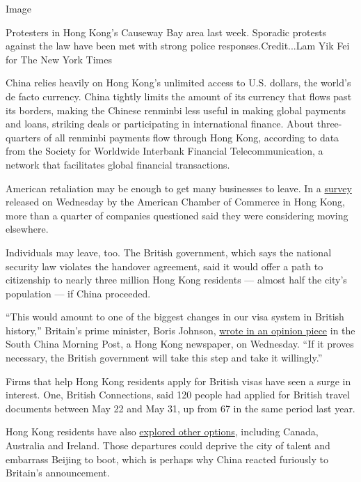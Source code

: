 Image

Protesters in Hong Kong's Causeway Bay area last week. Sporadic protests
against the law have been met with strong police responses.Credit...Lam
Yik Fei for The New York Times

China relies heavily on Hong Kong's unlimited access to U.S. dollars,
the world's de facto currency. China tightly limits the amount of its
currency that flows past its borders, making the Chinese renminbi less
useful in making global payments and loans, striking deals or
participating in international finance. About three-quarters of all
renminbi payments flow through Hong Kong, according to data from the
Society for Worldwide Interbank Financial Telecommunication, a network
that facilitates global financial transactions.

American retaliation may be enough to get many businesses to leave. In a
\href{https://amcham.org.hk/uploads/media/default/0001/08/e63cc524fe6b2d94c1b12b01c6249e144a394a9a.pdf}{survey}
released on Wednesday by the American Chamber of Commerce in Hong Kong,
more than a quarter of companies questioned said they were considering
moving elsewhere.

Individuals may leave, too. The British government, which says the
national security law violates the handover agreement, said it would
offer a path to citizenship to nearly three million Hong Kong residents
--- almost half the city's population --- if China proceeded.

``This would amount to one of the biggest changes in our visa system in
British history,'' Britain's prime minister, Boris Johnson,
\href{https://www.scmp.com/comment/opinion/article/3087252/hongkongers-fearing-their-way-life-britain-will-provide-alternative}{wrote
in an opinion piece} in the South China Morning Post, a Hong Kong
newspaper, on Wednesday. ``If it proves necessary, the British
government will take this step and take it willingly.''

Firms that help Hong Kong residents apply for British visas have seen a
surge in interest. One, British Connections, said 120 people had applied
for British travel documents between May 22 and May 31, up from 67 in
the same period last year.

Hong Kong residents have also
\href{https://www.nytimes3xbfgragh.onion/2020/01/03/business/hong-kong-protests-future.html}{explored
other options}, including Canada, Australia and Ireland. Those
departures could deprive the city of talent and embarrass Beijing to
boot, which is perhaps why China reacted furiously to Britain's
announcement.


